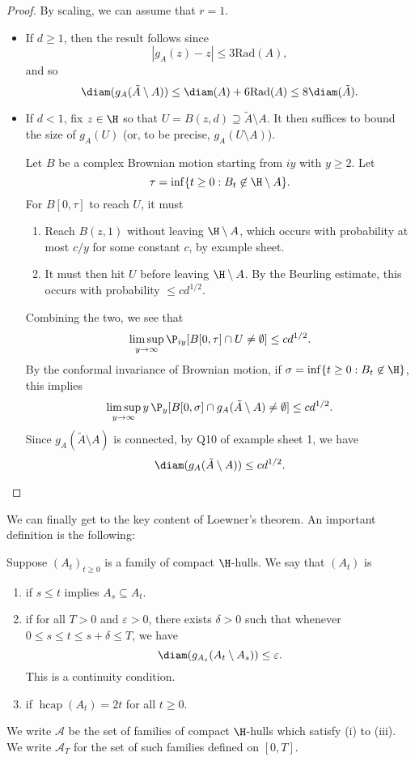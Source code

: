 \documentclass[a4paper]{article}
\DeclareMathOperator\hcap{hcap}
\newcommand\rad{\mathrm{Rad}}
\begin{document}
\begin{proof}
  By scaling, we can assume that $r = 1$.
  \begin{itemize}
    \item If $d \geq 1$, then the result follows since
      \[
        |g_A(z) - z| \leq 3 \rad(A),
      \]
      and so
      \[
        \diam(g_A(\tilde{A}\setminus A)) \leq \diam(A) + 6 \rad(A) \leq 8 \diam(\tilde{A}).
      \]
    \item If $d < 1$, fix $z \in \H$ so that $U = B(z, d) \supseteq \tilde{A} \setminus A$. It then suffices to bound the size of $g_A(U)$ (or, to be precise, $g_A(U \setminus A)$).

      Let $B$ be a complex Brownian motion starting from $iy$ with $y \geq 2$. Let
      \[
        \tau = \inf \{t \geq 0: B_t \not \in \H \setminus A\}.
      \]
      For $B[0, \tau]$ to reach $U$, it must
      \begin{enumerate}
        \item Reach $B(z, 1)$ without leaving $\H \setminus A$, which occurs with probability at most $c/y$ for some constant $c$, by example sheet.
        \item It must then hit $U$ before leaving $\H \setminus A$. By the Beurling estimate, this occurs with probability $\leq c d^{1/2}$.
      \end{enumerate}
      Combining the two, we see that
      \[
        \limsup_{y \to \infty} \P_{iy}[B[0, \tau] \cap U \not= \emptyset] \leq c d^{1/2}.
      \]
      By the conformal invariance of Brownian motion, if $\sigma = \inf \{t \geq 0 : B_t \not \in \H\}$, this implies
      \[
        \limsup_{y \to \infty} y\, \P_y [B[0, \sigma] \cap g_A(\tilde{A} \setminus A) \not= \emptyset] \leq c d^{1/2}.
      \]
      Since $g_A(\tilde{A} \setminus A)$ is connected, by Q10 of example sheet 1, we have
      \[
        \diam(g_A(\tilde{A} \setminus A)) \leq cd^{1/2}.\qedhere
      \]%
  \end{itemize}
\end{proof}

We can finally get to the key content of Loewner's theorem. An important definition is the following:
\begin{defi}
  Suppose $(A_t)_{t \geq 0}$ is a family of compact $\H$-hulls. We say that $(A_t)$ is
  \begin{enumerate}
    \item {} if $s \leq t$ implies $A_s \subseteq A_t$.
    \item {} if for all $T > 0$ and $\varepsilon > 0$, there exists $\delta > 0$ such that whenever $0 \leq s \leq t \leq s + \delta \leq T$, we have
      \[
        \diam(g_{A_s}(A_t \setminus A_s)) \leq \varepsilon.
      \]
      This is a continuity condition.
    \item {} if $\hcap(A_t) = 2t$ for all $t \geq 0$.
  \end{enumerate}
  We write $\mathcal{A}$ be the set of families of compact $\H$-hulls which satisfy (i) to (iii). We write $\mathcal{A}_T$ for the set of such families defined on $[0, T]$.
\end{defi}
\end{document}
